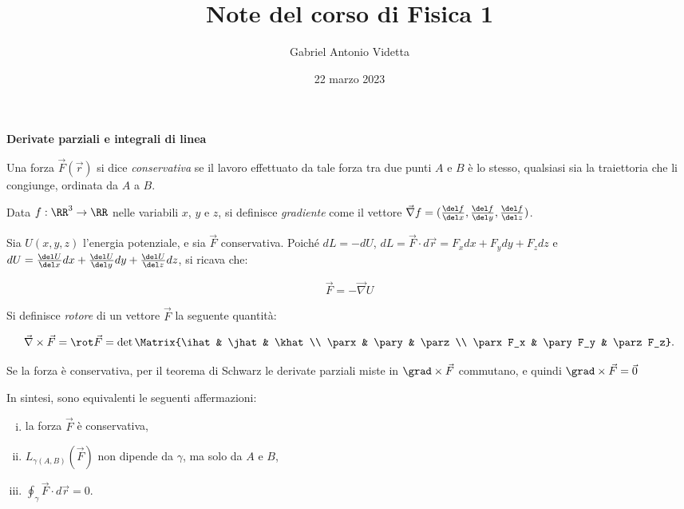 \documentclass[11pt]{article}
\title{\textbf{Note del corso di Fisica 1}}
\author{Gabriel Antonio Videtta}
\date{22 marzo 2023}
\begin{document}
	
	\maketitle
	
	\begin{center}
		\Large \textbf{Derivate parziali e integrali di linea}
	\end{center}

	\begin{definition}
		Una forza $\vec{F}(\vec{r})$ si dice \textit{conservativa} se
		il lavoro effettuato da tale forza tra due punti $A$ e $B$ è lo stesso,
		qualsiasi sia la traiettoria che li congiunge, ordinata da $A$ a
		$B$.
	\end{definition}
	
	\begin{definition}
		Data $f : \RR^3 \to \RR$ nelle variabili $x$, $y$ e $z$, si definisce \textit{gradiente} come
		il vettore $\vec{\nabla}f = (\frac{\del f}{\del x}, \frac{\del f}{\del y}, \frac{\del f}{\del z})$.
	\end{definition}
	
	\begin{remark}
		Sia $U(x, y, z)$ l'energia potenziale, e sia $\vec{F}$ conservativa.	
		Poiché $dL = - dU$, $dL = \vec{F} \cdot d\vec{r} =
		F_x dx + F_y dy + F_z dz$ e $dU = \frac{\del U}{\del x} dx +
		\frac{\del U}{\del y} dy + \frac{\del U}{\del z} dz$, si
		ricava che:
		
		\[ \vec{F} = - \vec{\nabla} U  \]
	\end{remark}

	\begin{definition}
		Si definisce \textit{rotore} di un vettore $\vec{F}$ la seguente quantità:
		
		
		\[\vec{\nabla} \times \vec{F} = \rot \vec{F} = \det \Matrix{\ihat & \jhat & \khat \\ \parx & \pary & \parz \\ \parx F_x & \pary F_y & \parz F_z}.\]
	\end{definition}
	
	\begin{remark}
		Se la forza è conservativa, per il teorema di Schwarz le
		derivate parziali miste in $\grad \times \vec{F}$ commutano, e
		quindi $\grad \times \vec{F} = \vec{0}$
	\end{remark}

	\begin{remark}
		In sintesi, sono equivalenti le seguenti affermazioni:
		
		\begin{enumerate}[(i)]
			\item la forza $\vec{F}$ è conservativa,
			\item $L_{\gamma(A,B)} (\vec{F})$ non dipende da $\gamma$,
			ma solo da $A$ e $B$,
			\item $\oint_\gamma \vec{F} \cdot d \vec{r} = 0$.
		\end{enumerate}
	\end{remark}
\end{document}
